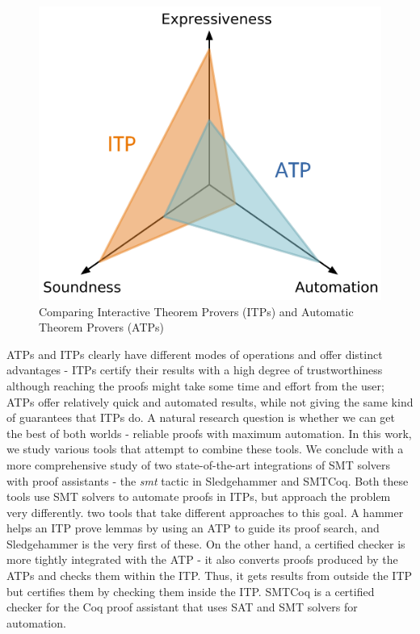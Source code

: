 \documentclass{article}
\begin{document}
	\begin{figure}[t]
		\centering
		\includegraphics[scale=0.5]{coq.pdf}
		\caption{Comparing Interactive Theorem Provers (ITPs)
		and Automatic Theorem Provers (ATPs)}
		\label{fig:graph}
	\end{figure}

	ATPs and ITPs clearly have different modes of operations
	and offer distinct advantages - ITPs certify their 
	results with a high degree of trustworthiness although 
	reaching the proofs might take some time and effort from 
	the user; ATPs offer relatively quick and automated results, 
	while not giving the same kind of guarantees that ITPs do.
	A natural research question is whether we can get the best 
	of both worlds - reliable proofs with maximum automation. 
	In this work, we study various tools that 
	attempt to combine these tools. We conclude with a 
	more comprehensive study of two state-of-the-art
	integrations of SMT solvers with proof assistants -
	the \textit{smt} tactic in Sledgehammer and 
	SMTCoq. Both these tools use SMT solvers to 
	automate proofs in ITPs, but approach the 
	problem very differently. 
	two tools that take different approaches 
	to this goal. A hammer helps an ITP prove lemmas by using 
	an ATP to guide its proof search, and Sledgehammer is
	the very first of these. On the other hand, 
	a certified checker is more tightly integrated with the ATP 
	- it also converts proofs produced by the ATPs and 
	checks them within the ITP. Thus, it gets results 
	from outside the ITP but certifies them by checking them
	inside the ITP. SMTCoq is a certified checker 
	for the Coq proof assistant that uses SAT and SMT solvers
	for automation.
	
\end{document}
